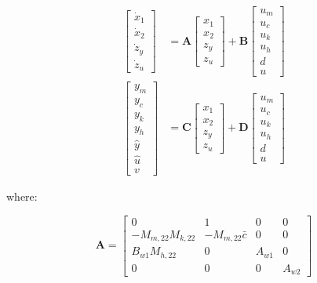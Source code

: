 \documentclass{scrreprt}
\begin{document}
\begin{align*}
\begin{bmatrix}
\dot{x}_1 \\
\dot{x}_2 \\
\dot{z}_y \\
\dot{z}_u
\end{bmatrix} &= \boldsymbol{A} \begin{bmatrix}
x_1 \\
x_2 \\
z_y \\
z_u
\end{bmatrix} + \boldsymbol{B} \begin{bmatrix}
        u_m\\u_c\\u_k\\u_h\\d\\u
    \end{bmatrix} \\
\begin{bmatrix}
        y_m\\y_c\\y_k\\y_h\\
        \hat{y}\\\hat{u}\\v
    \end{bmatrix} &= \boldsymbol{C} \begin{bmatrix}
x_1 \\
x_2 \\
z_y \\
z_u
\end{bmatrix} + \boldsymbol{D} \begin{bmatrix}
        u_m\\u_c\\u_k\\u_h\\d\\u
    \end{bmatrix}
\end{align*}

\noindent where:

\[
\boldsymbol{A} =
\begin{bmatrix}
0 & 1 & 0 & 0 \\
-M_{m,22}M_{k,22} & -M_{m,22}\bar{c} & 0 & 0 \\
B_{w1}M_{h,22} & 0 & A_{w1} & 0 \\
0 & 0 & 0 & A_{w2}
\end{bmatrix}
\]
\end{document}
